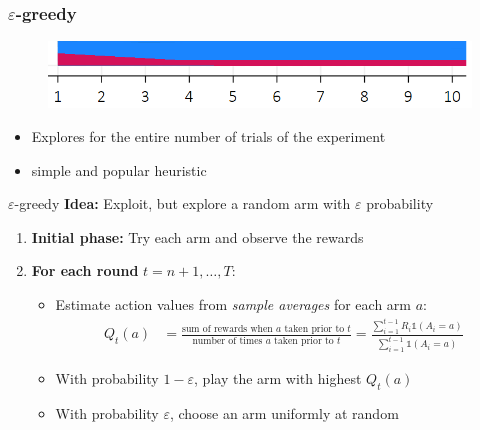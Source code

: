 \documentclass[11pt,table]{beamer}
\begin{document}
\begin{frame}\frametitle{$\varepsilon$-greedy}
\renewcommand{\baselinestretch}{1}
\begin{figure}
    \centering
    \includegraphics[width=0.9\linewidth]{figures/epsilon greedy 2.png}
\end{figure}
\begin{itemize}
    \item Explores for the entire number of trials of the experiment
    \item simple and popular heuristic \citep{sutton2018reinforcement, Bubeck2012, Burtini2015}%
\end{itemize}

\end{frame}


\begin{frame}{$\varepsilon$-greedy}
\textbf{Idea:} Exploit, but explore a random arm with $\varepsilon$ probability

\vspace{1em}
\begin{enumerate}
    \item \textbf{Initial phase:} Try each arm and observe the rewards\pause

    \item \textbf{For each round } $t = n+1, \ldots, T$:
    \begin{itemize}
        \item Estimate action values from \emph{sample averages} for each arm $a$:
\begin{align*}
        Q_{t}(a) &= \frac{\text{sum of rewards when }a\text{ taken prior to }t}{\text{number of times }a\text{ taken prior to }t}=\frac{\sum_{i=1}^{t-1} R_i \mathds{1}(A_i=a)}{\sum_{i=1}^{t-1} \mathds{1}(A_i=a)}
\end{align*}
        \pause
        \item With probability $1 - \varepsilon$, play the arm with highest $Q_{t}(a)$\pause
        \item With probability $\varepsilon$, choose an arm uniformly at random
    \end{itemize}
\end{enumerate}
\end{frame}
\end{document}
